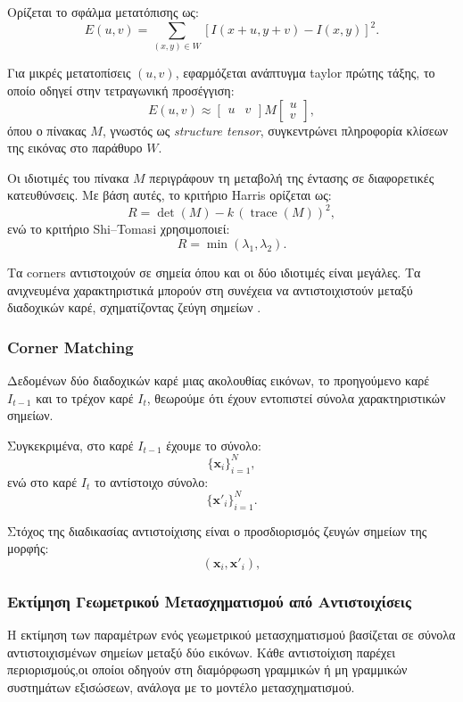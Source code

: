 \documentclass[12pt]{article}
\begin{document}
Ορίζεται το σφάλμα μετατόπισης ως:
\[
E(u,v) =
\sum_{(x,y)\in W}
\left[ I(x+u,y+v) - I(x,y) \right]^2.
\]

Για μικρές μετατοπίσεις \((u,v)\), εφαρμόζεται ανάπτυγμα taylor πρώτης τάξης, το οποίο οδηγεί στην τετραγωνική προσέγγιση:
\[
E(u,v) \approx
\begin{bmatrix}
u & v
\end{bmatrix}
M
\begin{bmatrix}
u \\
v
\end{bmatrix},
\]
όπου ο πίνακας \(M\), γνωστός ως \textit{structure tensor}, συγκεντρώνει πληροφορία κλίσεων της εικόνας στο παράθυρο \(W\).

Οι ιδιοτιμές του πίνακα \(M\) περιγράφουν τη μεταβολή της έντασης σε διαφορετικές κατευθύνσεις. Με βάση αυτές, το κριτήριο Harris ορίζεται ως:
\[
R = \det(M) - k\,(\operatorname{trace}(M))^2,
\]
ενώ το κριτήριο Shi--Tomasi χρησιμοποιεί:
\[
R = \min(\lambda_1,\lambda_2).
\]

Τα corners αντιστοιχούν σε σημεία όπου και οι δύο ιδιοτιμές είναι μεγάλες. Τα ανιχνευμένα χαρακτηριστικά μπορούν στη συνέχεια να αντιστοιχιστούν μεταξύ διαδοχικών καρέ, σχηματίζοντας ζεύγη σημείων .

\subsubsection{Corner Matching}
Δεδομένων δύο διαδοχικών καρέ μιας ακολουθίας εικόνων, το προηγούμενο καρέ \(I_{t-1}\) και το τρέχον καρέ \(I_t\), θεωρούμε ότι έχουν εντοπιστεί σύνολα χαρακτηριστικών σημείων.

Συγκεκριμένα, στο καρέ \(I_{t-1}\) έχουμε το σύνολο:
\[
\{\mathbf{x}_i\}_{i=1}^{N},
\]
ενώ στο καρέ \(I_t\) το αντίστοιχο σύνολο:
\[
\{\mathbf{x}'_i\}_{i=1}^{N}.
\]

Στόχος της διαδικασίας αντιστοίχισης είναι ο προσδιορισμός ζευγών σημείων της μορφής:
\[
(\mathbf{x}_i, \mathbf{x}'_i),
\]



\subsubsection{Εκτίμηση Γεωμετρικού Μετασχηματισμού από Αντιστοιχίσεις}
Η εκτίμηση των παραμέτρων ενός γεωμετρικού μετασχηματισμού βασίζεται σε σύνολα αντιστοιχισμένων σημείων μεταξύ δύο εικόνων. 
Κάθε αντιστοίχιση παρέχει περιορισμούς,οι οποίοι οδηγούν στη διαμόρφωση γραμμικών ή μη γραμμικών συστημάτων εξισώσεων, ανάλογα με το μοντέλο μετασχηματισμού.
\end{document}
